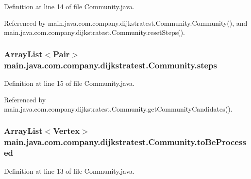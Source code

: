 Definition at line 14 of file Community.\-java.



Referenced by main.\-java.\-com.\-company.\-dijkstratest.\-Community.\-Community(), and main.\-java.\-com.\-company.\-dijkstratest.\-Community.\-reset\-Steps().

\hypertarget{classmain_1_1java_1_1com_1_1company_1_1dijkstratest_1_1_community_adbb6dc448c6e9ffdcd3207b5117e5ac6}{
\subsubsection[{steps}]{\setlength{\rightskip}{0pt plus 5cm}Array\-List$<${\bf Pair}$>$ main.\-java.\-com.\-company.\-dijkstratest.\-Community.\-steps\hspace{0.3cm}{\ttfamily [private]}}}\label{classmain_1_1java_1_1com_1_1company_1_1dijkstratest_1_1_community_adbb6dc448c6e9ffdcd3207b5117e5ac6}


Definition at line 15 of file Community.\-java.



Referenced by main.\-java.\-com.\-company.\-dijkstratest.\-Community.\-get\-Community\-Candidates().

\hypertarget{classmain_1_1java_1_1com_1_1company_1_1dijkstratest_1_1_community_a2ccabf2789253dffe72aa412e7412f7d}{
\subsubsection[{to\-Be\-Processed}]{\setlength{\rightskip}{0pt plus 5cm}Array\-List$<${\bf Vertex}$>$ main.\-java.\-com.\-company.\-dijkstratest.\-Community.\-to\-Be\-Processed\hspace{0.3cm}{\ttfamily [private]}}}\label{classmain_1_1java_1_1com_1_1company_1_1dijkstratest_1_1_community_a2ccabf2789253dffe72aa412e7412f7d}


Definition at line 13 of file Community.\-java.



